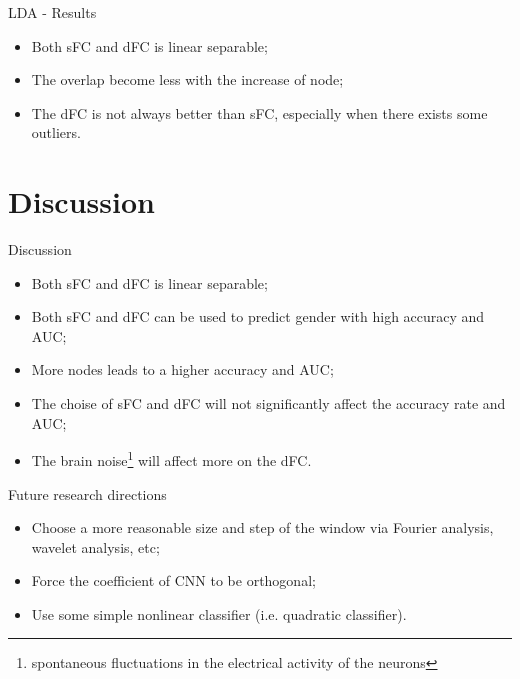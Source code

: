 \documentclass{beamer}
\begin{document}

\begin{frame}{LDA - Results}

    \begin{itemize}
        \item Both sFC and dFC is linear separable;
        \item The overlap become less with the increase of node;
        \item The dFC is not always better than sFC, especially when there exists some outliers.
    \end{itemize}

\end{frame}

\section{Discussion}
\begin{frame}{Discussion}

    \begin{itemize}
        \item Both sFC and dFC is linear separable;
        \item Both sFC and dFC can be used to predict gender with high accuracy and AUC;
        \item More nodes leads to a higher accuracy and AUC;
        \item The choise of sFC and dFC will not significantly affect the accuracy rate and AUC;
        \item The brain noise\footnote{spontaneous fluctuations in the electrical activity of the neurons} will affect more on the dFC.
    \end{itemize}

\end{frame}

\begin{frame}{Future research directions}

    \begin{itemize}
        \item Choose a more reasonable size and step of the window via Fourier analysis, wavelet analysis, etc;
        \item Force the coefficient of CNN to be orthogonal;
        \item Use some simple nonlinear classifier (i.e. quadratic classifier).
    \end{itemize}

\end{frame}
\end{document}
